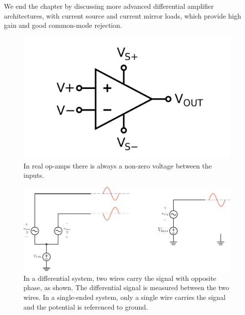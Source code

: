 We end the chapter by discussing more advanced differential amplifier architectures, with current source and current mirror loads, which provide high gain and good common-mode rejection.
\begin{figure}[H]
\centering
\includegraphics[scale=0.35]{op_amp_diff}
\caption{In real op-amps there is always a non-zero voltage between the inputs.}
\label{fig:ch16_intro}
\end{figure}
\newpage
\begin{figure}[t]
\centering
\includegraphics[scale=1.00]{diff_vs_cm} 
\caption{In a differential system, two wires carry the signal with opposite phase, as shown.  The differential signal is measured between the two wires.  In a single-ended system, only a single wire carries the signal and the potential is referenced to ground.}
\label{fig:diff_circ}
\end{figure}
